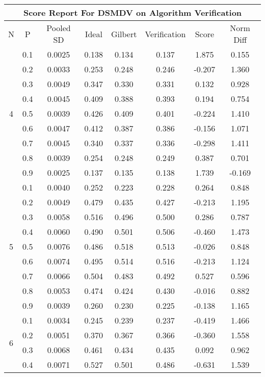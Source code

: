 \documentclass[11pt,a4paper]{report}
\begin{document}
\begin{longtable}{ | c | c || c | c | c | c | c | c | }
\hline
\multicolumn{8}{|c|}{ Score Report For DSMDV on Algorithm Verification} \\
\hline
N & P & Pooled SD &  Ideal &  Gilbert & Verification  & Score & Norm Diff \\
 \hline
 \hline
 \endhead
\multirow{9}{*}{4} & 0.1 & 0.0025 & 0.138 & 0.134 & 0.137 & 1.875 & 0.155 \\
 & 0.2 & 0.0033 & 0.253 & 0.248 & 0.246 & -0.207 & 1.360 \\
 & 0.3 & 0.0049 & 0.347 & 0.330 & 0.331 & 0.132 & 0.928 \\
 & 0.4 & 0.0045 & 0.409 & 0.388 & 0.393 & 0.194 & 0.754 \\
 & 0.5 & 0.0039 & 0.426 & 0.409 & 0.401 & -0.224 & 1.410 \\
 & 0.6 & 0.0047 & 0.412 & 0.387 & 0.386 & -0.156 & 1.071 \\
 & 0.7 & 0.0045 & 0.340 & 0.337 & 0.336 & -0.298 & 1.411 \\
 & 0.8 & 0.0039 & 0.254 & 0.248 & 0.249 & 0.387 & 0.701 \\
 & 0.9 & 0.0025 & 0.137 & 0.135 & 0.138 & 1.739 & -0.169 \\
 \hline
\multirow{9}{*}{5} & 0.1 & 0.0040 & 0.252 & 0.223 & 0.228 & 0.264 & 0.848 \\
 & 0.2 & 0.0049 & 0.479 & 0.435 & 0.427 & -0.213 & 1.195 \\
 & 0.3 & 0.0058 & 0.516 & 0.496 & 0.500 & 0.286 & 0.787 \\
 & 0.4 & 0.0060 & 0.490 & 0.501 & 0.506 & -0.460 & 1.473 \\
 & 0.5 & 0.0076 & 0.486 & 0.518 & 0.513 & -0.026 & 0.848 \\
 & 0.6 & 0.0074 & 0.495 & 0.514 & 0.516 & -0.213 & 1.124 \\
 & 0.7 & 0.0066 & 0.504 & 0.483 & 0.492 & 0.527 & 0.596 \\
 & 0.8 & 0.0053 & 0.474 & 0.424 & 0.430 & -0.016 & 0.882 \\
 & 0.9 & 0.0039 & 0.260 & 0.230 & 0.225 & -0.138 & 1.165 \\
 \hline
\multirow{9}{*}{6} & 0.1 & 0.0034 & 0.245 & 0.239 & 0.237 & -0.419 & 1.466 \\
 & 0.2 & 0.0051 & 0.370 & 0.367 & 0.366 & -0.360 & 1.558 \\
 & 0.3 & 0.0068 & 0.461 & 0.434 & 0.435 & 0.092 & 0.962 \\
 & 0.4 & 0.0071 & 0.527 & 0.501 & 0.486 & -0.631 & 1.539 \\

\end{longtable}
\end{document}
